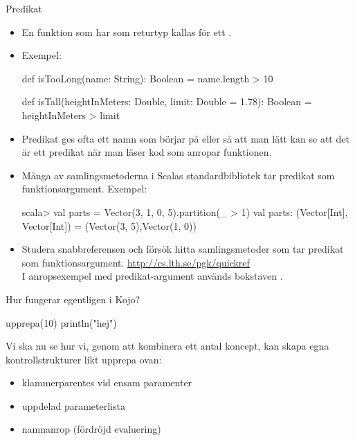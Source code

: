 \begin{Slide}{Predikat}
\begin{itemize}\SlideFontSmall
\item En funktion som har  som returtyp kallas för ett . 
\item Exempel:
\begin{Code}
def isTooLong(name: String): Boolean = name.length > 10

def isTall(heightInMeters: Double, limit: Double = 1.78): Boolean = 
  heightInMeters > limit
\end{Code}
\item Predikat ges ofta ett namn som börjar på  eller  så att man lätt kan se att det är ett predikat när man läser kod som anropar funktionen.
\item Många av samlingsmetoderna i Scalas standardbibliotek tar predikat som funktionsargument. Exempel: 
\begin{REPLnonum}
scala> val parts = Vector(3, 1, 0, 5).partition(_ > 1)
val parts: (Vector[Int], Vector[Int]) = 
  (Vector(3, 5),Vector(1, 0))
\end{REPLnonum} 
\item Studera snabbreferensen och försök hitta samlingsmetoder som tar predikat som funktionsargument. \url{http://cs.lth.se/pgk/quickref} \\I anropsexempel med predikat-argument används bokstaven .
\end{itemize}  
\end{Slide}


  

\begin{Slide}{Hur fungerar egentligen  i Kojo?}
\begin{Code}[basicstyle=\ttfamily\SlideFontSize{14}{16}]
upprepa(10) {
  println("hej")
}
\end{Code}

\pause
Vi ska nu se hur vi, genom att kombinera ett antal koncept, kan skapa egna kontrollstrukturer likt upprepa ovan:
\begin{itemize}
\item klammerparentes vid ensam paramenter
\item uppdelad parameterlista
\item namnanrop (fördröjd evaluering)
\end{itemize}
\end{Slide}



